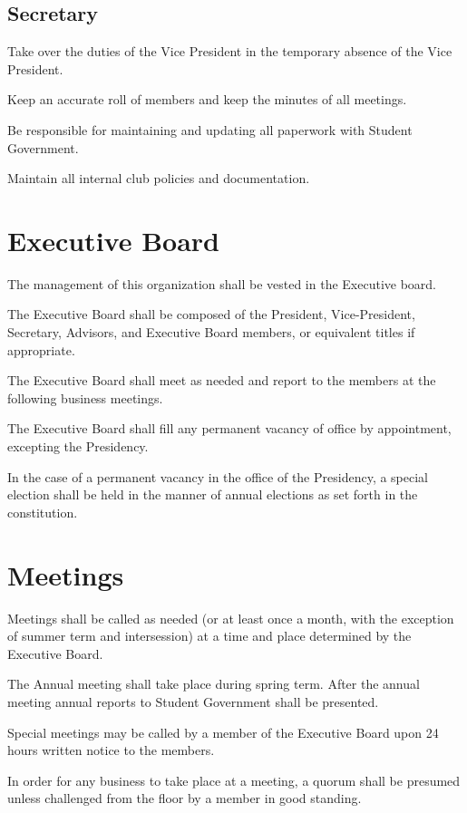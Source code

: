 \subsection{Secretary}
\begin{subroutines}
	\item Take over the duties of the Vice President in the temporary absence of the Vice President.
	\item Keep an accurate roll of members and keep the minutes of all meetings.
	\item Be responsible for maintaining and updating all paperwork with Student Government.
	\item Maintain all internal club policies and documentation.
\end{subroutines}

\section{Executive Board}
\begin{subroutines}
\item The management of this organization shall be vested in the Executive board.
\item The Executive Board shall be composed of the President, Vice-President, Secretary, Advisors, and Executive Board members, or equivalent titles if appropriate.
\item The Executive Board shall meet as needed and report to the members at the following business meetings.
\item The Executive Board shall fill any permanent vacancy of office by appointment, excepting the Presidency.
\item In the case of a permanent vacancy in the office of the Presidency, a special election shall be held in the manner of annual elections as set forth in the constitution.
\end{subroutines}

\section{Meetings}
\begin{subroutines}
\item Meetings shall be called as needed (or at least once a month, with the exception of summer term and intersession) at a time and place determined by the Executive Board.
\item The Annual meeting shall take place during spring term. After the annual meeting annual reports to Student Government shall be presented.
\item Special meetings may be called by a member of the Executive Board upon 24 hours written notice to the members.
\item In order for any business to take place at a meeting, a quorum shall be presumed unless challenged from the floor by a member in good standing.
\end{subroutines}

